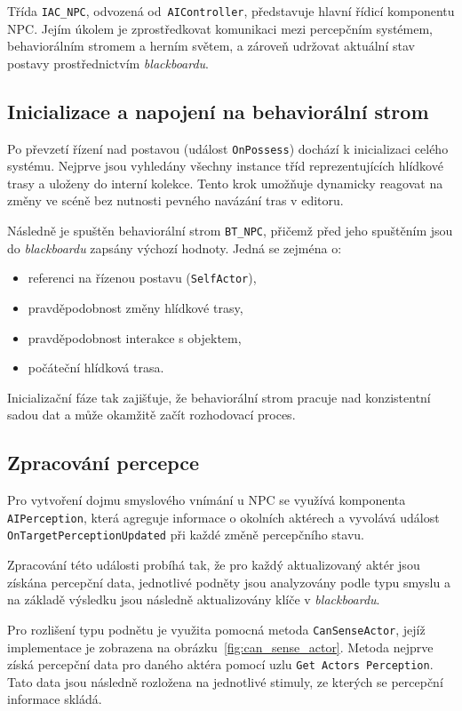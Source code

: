Třída \texttt{IAC\_NPC}, odvozená od~\texttt{AIController}, představuje hlavní řídicí komponentu NPC. 
Jejím úkolem je zprostředkovat komunikaci mezi percepčním systémem, behaviorálním stromem a herním světem, a zároveň udržovat aktuální stav 
postavy prostřednictvím \textit{blackboardu}.

\subsection{Inicializace a napojení na behaviorální strom}

Po převzetí řízení nad postavou (událost \texttt{OnPossess}) dochází k inicializaci celého systému.
Nejprve jsou vyhledány všechny instance tříd reprezentujících hlídkové trasy a uloženy do interní kolekce.
Tento krok umožňuje dynamicky reagovat na změny ve scéně bez nutnosti pevného navázání tras v editoru.

Následně je spuštěn behaviorální strom \texttt{BT\_NPC}, přičemž před jeho spuštěním jsou do \textit{blackboardu}
zapsány výchozí hodnoty. Jedná se zejména o:
\begin{itemize}
    \item referenci na řízenou postavu (\texttt{SelfActor}),
    \item pravděpodobnost změny hlídkové trasy,
    \item pravděpodobnost interakce s objektem,
    \item počáteční hlídková trasa.
\end{itemize}

Inicializační fáze tak zajišťuje, že behaviorální strom pracuje nad konzistentní sadou dat a může okamžitě začít rozhodovací proces.

\subsection{Zpracování percepce}

Pro vytvoření dojmu smyslového vnímání u NPC se využívá komponenta \texttt{AIPerception}, která agreguje informace o okolních aktérech
a vyvolává událost \texttt{OnTargetPerceptionUpdated} při každé změně percepčního stavu.

Zpracování této události probíhá tak, že pro každý aktualizovaný aktér jsou získána
percepční data, jednotlivé podněty jsou analyzovány podle typu smyslu
a na základě výsledku jsou následně aktualizovány klíče v \textit{blackboardu}.

Pro rozlišení typu podnětu je využita pomocná metoda \texttt{CanSenseActor}, jejíž implementace 
je zobrazena na obrázku~\ref{fig:can_sense_actor}.
Metoda nejprve získá percepční data pro daného aktéra pomocí uzlu \texttt{Get Actors Perception}. 
Tato data jsou následně rozložena na jednotlivé stimuly, ze kterých se percepční informace skládá.

